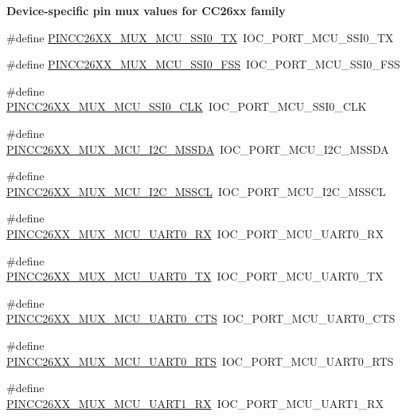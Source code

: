 \begin{Indent}{\bf Device-\/specific pin mux values for C\-C26xx family}
\begin{DoxyCompactItemize}
\item 
\#define \hyperlink{_p_i_n_c_c26_x_x_8h_a330141f9fd840aec1b7c4cabc111363a}{P\-I\-N\-C\-C26\-X\-X\-\_\-\-M\-U\-X\-\_\-\-M\-C\-U\-\_\-\-S\-S\-I0\-\_\-\-T\-X}~I\-O\-C\-\_\-\-P\-O\-R\-T\-\_\-\-M\-C\-U\-\_\-\-S\-S\-I0\-\_\-\-T\-X
\item 
\#define \hyperlink{_p_i_n_c_c26_x_x_8h_a1ac8e06c048c6a1951e11054abcf1c60}{P\-I\-N\-C\-C26\-X\-X\-\_\-\-M\-U\-X\-\_\-\-M\-C\-U\-\_\-\-S\-S\-I0\-\_\-\-F\-S\-S}~I\-O\-C\-\_\-\-P\-O\-R\-T\-\_\-\-M\-C\-U\-\_\-\-S\-S\-I0\-\_\-\-F\-S\-S
\item 
\#define \hyperlink{_p_i_n_c_c26_x_x_8h_a77b7d2034982c09c8c3a75591b226e95}{P\-I\-N\-C\-C26\-X\-X\-\_\-\-M\-U\-X\-\_\-\-M\-C\-U\-\_\-\-S\-S\-I0\-\_\-\-C\-L\-K}~I\-O\-C\-\_\-\-P\-O\-R\-T\-\_\-\-M\-C\-U\-\_\-\-S\-S\-I0\-\_\-\-C\-L\-K
\item 
\#define \hyperlink{_p_i_n_c_c26_x_x_8h_aa3db9a339c53a66396c6fdfde6d6062c}{P\-I\-N\-C\-C26\-X\-X\-\_\-\-M\-U\-X\-\_\-\-M\-C\-U\-\_\-\-I2\-C\-\_\-\-M\-S\-S\-D\-A}~I\-O\-C\-\_\-\-P\-O\-R\-T\-\_\-\-M\-C\-U\-\_\-\-I2\-C\-\_\-\-M\-S\-S\-D\-A
\item 
\#define \hyperlink{_p_i_n_c_c26_x_x_8h_aa617fb5a0aeeda3e4bf7150d5e76a397}{P\-I\-N\-C\-C26\-X\-X\-\_\-\-M\-U\-X\-\_\-\-M\-C\-U\-\_\-\-I2\-C\-\_\-\-M\-S\-S\-C\-L}~I\-O\-C\-\_\-\-P\-O\-R\-T\-\_\-\-M\-C\-U\-\_\-\-I2\-C\-\_\-\-M\-S\-S\-C\-L
\item 
\#define \hyperlink{_p_i_n_c_c26_x_x_8h_ab2932b3af0495872bf444b90cb83d2c0}{P\-I\-N\-C\-C26\-X\-X\-\_\-\-M\-U\-X\-\_\-\-M\-C\-U\-\_\-\-U\-A\-R\-T0\-\_\-\-R\-X}~I\-O\-C\-\_\-\-P\-O\-R\-T\-\_\-\-M\-C\-U\-\_\-\-U\-A\-R\-T0\-\_\-\-R\-X
\item 
\#define \hyperlink{_p_i_n_c_c26_x_x_8h_a5b92514b6f947d9d333927e7f6973677}{P\-I\-N\-C\-C26\-X\-X\-\_\-\-M\-U\-X\-\_\-\-M\-C\-U\-\_\-\-U\-A\-R\-T0\-\_\-\-T\-X}~I\-O\-C\-\_\-\-P\-O\-R\-T\-\_\-\-M\-C\-U\-\_\-\-U\-A\-R\-T0\-\_\-\-T\-X
\item 
\#define \hyperlink{_p_i_n_c_c26_x_x_8h_a522aeda2895c5cb3b0193b2ef3c2d718}{P\-I\-N\-C\-C26\-X\-X\-\_\-\-M\-U\-X\-\_\-\-M\-C\-U\-\_\-\-U\-A\-R\-T0\-\_\-\-C\-T\-S}~I\-O\-C\-\_\-\-P\-O\-R\-T\-\_\-\-M\-C\-U\-\_\-\-U\-A\-R\-T0\-\_\-\-C\-T\-S
\item 
\#define \hyperlink{_p_i_n_c_c26_x_x_8h_a51f1fec524b48909fcfd7f619fb0c008}{P\-I\-N\-C\-C26\-X\-X\-\_\-\-M\-U\-X\-\_\-\-M\-C\-U\-\_\-\-U\-A\-R\-T0\-\_\-\-R\-T\-S}~I\-O\-C\-\_\-\-P\-O\-R\-T\-\_\-\-M\-C\-U\-\_\-\-U\-A\-R\-T0\-\_\-\-R\-T\-S
\item 
\#define \hyperlink{_p_i_n_c_c26_x_x_8h_a6248f1734f57a34106adcd1f1433da80}{P\-I\-N\-C\-C26\-X\-X\-\_\-\-M\-U\-X\-\_\-\-M\-C\-U\-\_\-\-U\-A\-R\-T1\-\_\-\-R\-X}~I\-O\-C\-\_\-\-P\-O\-R\-T\-\_\-\-M\-C\-U\-\_\-\-U\-A\-R\-T1\-\_\-\-R\-X

\end{DoxyCompactItemize}
\end{Indent}
